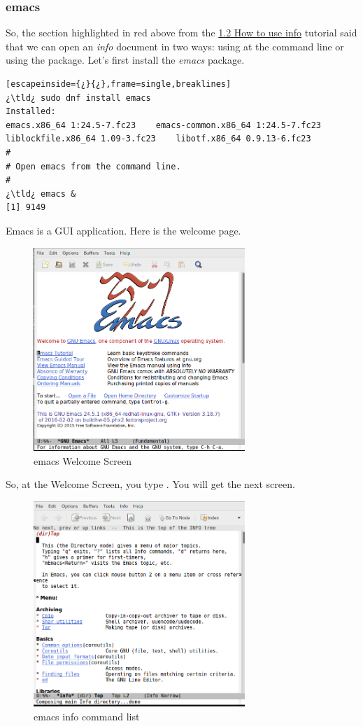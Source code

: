 \subsubsection{emacs}

So, the section highlighted in red above from the \hyperlink{infohowto}{1.2 How to use info} tutorial said that we can open an \emph{info} document in two ways: using  at the command line or using the  package. Let's first install the \emph{emacs} package.

\begin{lstlisting}[escapeinside={¿}{¿},frame=single,breaklines]
¿\tld¿ sudo dnf install emacs
Installed:
emacs.x86_64 1:24.5-7.fc23    emacs-common.x86_64 1:24.5-7.fc23    liblockfile.x86_64 1.09-3.fc23    libotf.x86_64 0.9.13-6.fc23  
#
# Open emacs from the command line.
#
¿\tld¿ emacs &
[1] 9149
\end{lstlisting}

Emacs is a GUI application. Here is the welcome page.

\begin{figure}[H]
\centering
\includegraphics[width=8cm]{figures/emacs_welcome}
\caption{emacs Welcome Screen}
\label{emacsWelcomeScreen}
\end{figure}


So, at the Welcome Screen, you type . You will get the next screen.

\begin{figure}[H]
\centering
\includegraphics[width=8cm]{figures/emacs_listofinfocmds}
\caption{emacs info command list}
\label{emacsInfoCommandList}
\end{figure}

